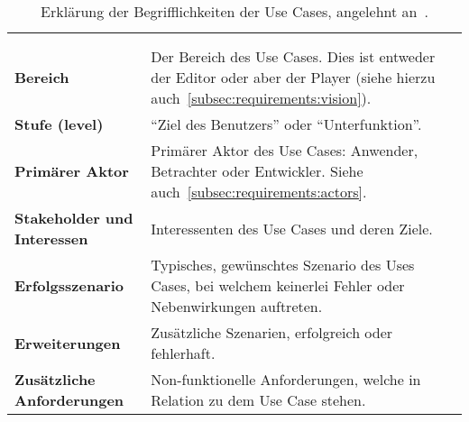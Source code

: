 
\begin{longtabu}{p{0.3\textwidth}p{0.7\textwidth}}
    \centering\\
    \caption{Erklärung der Begrifflichkeiten der Use
        Cases, angelehnt an~\cite[S.
        67]{larman_applying_2004}.}\label{table:uc-explanation}\\
    \toprule
        \textbf{Bereich} &
        Der Bereich des Use Cases. Dies ist entweder der Editor oder aber der
        Player (siehe hierzu auch~\ref{subsec:requirements:vision}).\\
    \cmidrule(r){1-1}\cmidrule(lr){2-2}
        \textbf{Stufe (level)} &
        ``Ziel des Benutzers'' oder ``Unterfunktion''.\\
    \cmidrule(r){1-1}\cmidrule(lr){2-2}
        \textbf{Primärer Aktor} &
        Primärer Aktor des Use Cases: Anwender, Betrachter oder Entwickler.
        Siehe auch~\ref{subsec:requirements:actors}. \\
    \cmidrule(r){1-1}\cmidrule(lr){2-2}
        \textbf{Stakeholder und Interessen} &
        Interessenten des Use Cases und deren Ziele.\\
    \cmidrule(r){1-1}\cmidrule(lr){2-2}
        \textbf{Erfolgsszenario} &
        Typisches, gewünschtes Szenario des Uses Cases, bei welchem keinerlei
        Fehler oder Nebenwirkungen auftreten.\\
    \cmidrule(r){1-1}\cmidrule(lr){2-2}
        \textbf{Erweiterungen} &
        Zusätzliche Szenarien, erfolgreich oder fehlerhaft.\\
    \cmidrule(r){1-1}\cmidrule(lr){2-2}
        \textbf{Zusätzliche Anforderungen} &
        Non-funktionelle Anforderungen, welche in Relation zu dem Use Case
        stehen.\\
    \bottomrule
\end{longtabu}
